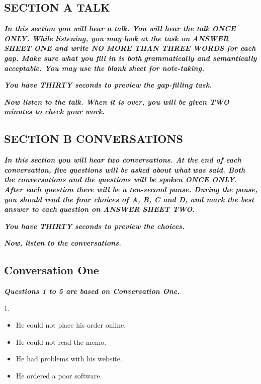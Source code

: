 \documentclass[UTF8,11pt]{ctexart}
\begin{document}
\subsection*{\textbf{SECTION A TALK}}


\textbf{\textit{In this section you will hear a talk. You will hear the talk ONCE ONLY. While listening, you may look at the task on}} \textbf{\textit{ANSWER SHEET ONE and write NO MORE THAN THREE WORDS for each gap. Make sure what you fill in is both}} \textbf{\textit{grammatically and semantically acceptable. You may use the blank sheet for note-taking.}}


\textbf{\textit{You have THIRTY seconds to preview the gap-filling task.}}


\textbf{\textit{Now listen to the talk. When it is over, you will be given TWO minutes to check your work.}}


\subsection*{\textbf{SECTION B CONVERSATIONS}}


\textbf{\textit{In this section you will hear two conversations. At the end of each conversation, five questions will be asked about what}} \textbf{\textit{was said. Both the conversations and the questions will be spoken ONCE ONLY. After each question there will be a ten-second pause. During the pause, you should read the four choices of A, B, C and D, and mark the best answer to each}} \textbf{\textit{question on ANSWER SHEET TWO.}}


\textbf{\textit{You have THIRTY seconds to preview the choices.}}


\textbf{\textit{Now, listen to the conversations.}}


\subsection*{\textbf{Conversation One}}


\textbf{\textit{Questions 1 to 5 are based on Conversation One.}}


1.


\begin{itemize}[leftmargin=2em,itemsep=.2em,topsep=.4em]\item[A.] He could not place his order online.
\item[B.] He could not read the memo.
\item[C.] He had problems with his website.
\item[D.] He ordered a poor software.
\end{itemize}
\end{document}
